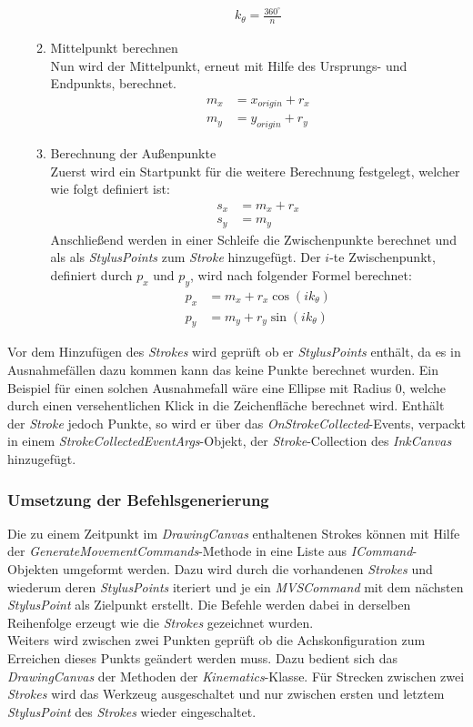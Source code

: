 \begin{itemize}
\begin{enumerate}
\begin{align*}
k_{\theta} = \frac{360^\circ}{n}
\end{align*}
\item Mittelpunkt berechnen\\
Nun wird der Mittelpunkt, erneut mit Hilfe des Ursprungs- und Endpunkts, berechnet.
\begin{align*}
m_x &= x_{origin} + r_x\\
m_y &= y_{origin} + r_y
\end{align*}
\item Berechnung der Außenpunkte\\
Zuerst wird ein Startpunkt für die weitere Berechnung festgelegt, welcher wie folgt definiert ist:
\begin{align*}
s_x &= m_x + r_x\\
s_y &= m_y
\end{align*}
Anschließend werden in einer Schleife die Zwischenpunkte berechnet und als als \textit{StylusPoints} zum \textit{Stroke} hinzugefügt. Der $i$-te Zwischenpunkt, definiert durch $p_x$ und $p_y$, wird nach folgender Formel berechnet:
\begin{align*}
p_x &= m_x + r_x \cos(ik_\theta)\\
p_y &= m_y + r_y \sin(ik_\theta)
\end{align*}
\end{enumerate}
\end{itemize}
Vor dem Hinzufügen des \textit{Strokes} wird geprüft ob er \textit{StylusPoints} enthält, da es in Ausnahmefällen dazu kommen kann das keine Punkte berechnet wurden. Ein Beispiel für einen solchen Ausnahmefall wäre eine Ellipse mit Radius 0, welche durch einen versehentlichen Klick in die Zeichenfläche berechnet wird. Enthält der \textit{Stroke} jedoch Punkte, so wird er über das \textit{OnStrokeCollected}-Events, verpackt in einem \textit{StrokeCollectedEventArgs}-Objekt, der \textit{Stroke}-Collection des \textit{InkCanvas} hinzugefügt. 

\subsubsection{Umsetzung der Befehlsgenerierung}

Die zu einem Zeitpunkt im \textit{DrawingCanvas} enthaltenen Strokes können mit Hilfe der \textit{GenerateMovementCommands}-Methode in eine Liste aus \textit{ICommand}-Objekten umgeformt werden. Dazu wird durch die vorhandenen \textit{Strokes} und wiederum deren \textit{StylusPoints} iteriert und je ein \textit{MVSCommand} mit dem nächsten \textit{StylusPoint} als Zielpunkt erstellt. Die Befehle werden dabei in derselben Reihenfolge erzeugt wie die \textit{Strokes} gezeichnet wurden.\\
Weiters wird zwischen zwei Punkten geprüft ob die Achskonfiguration zum Erreichen dieses Punkts geändert werden muss. Dazu bedient sich das \textit{DrawingCanvas} der Methoden der \textit{Kinematics}-Klasse.
Für Strecken zwischen zwei \textit{Strokes} wird das Werkzeug ausgeschaltet und nur zwischen ersten und letztem \textit{StylusPoint} des \textit{Strokes} wieder eingeschaltet.



